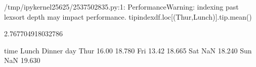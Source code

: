 \documentclass[letterpaper,10pt,english]{jupyterBook}
\begin{document}
\begin{sphinxVerbatim}[commandchars=\\\{\}]
/tmp/ipykernel\PYGZus{}25625/2537502835.py:1: PerformanceWarning: indexing past lexsort depth may impact performance.
  tip\PYGZus{}index\PYGZus{}df.loc[(\PYGZsq{}Thur\PYGZsq{},\PYGZsq{}Lunch\PYGZsq{})].tip.mean()
\end{sphinxVerbatim}

\begin{sphinxVerbatim}[commandchars=\\\{\}]
2.767704918032786
\end{sphinxVerbatim}

\begin{sphinxVerbatim}[commandchars=\\\{\}]
    
\end{sphinxVerbatim}

\begin{sphinxVerbatim}[commandchars=\\\{\}]
time  Lunch  Dinner
day                
Thur  16.00  18.780
Fri   13.42  18.665
Sat     NaN  18.240
Sun     NaN  19.630
\end{sphinxVerbatim}

\begin{sphinxVerbatim}[commandchars=\\\{\}]
\PYG{p}{[} \PYG{p}{]}\PYG{p}{[} \PYG{p}{]}\PYG{p}{[}\PYG{p}{]}
\end{sphinxVerbatim}
\end{document}
